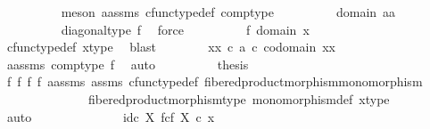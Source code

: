 \begin{isabellebody}
\ \ \ \ \ \ \ \ \isamarkupfalse%
\ {\isacharparenleft}{\kern0pt}meson\ a{\isacharunderscore}{\kern0pt}assms\ cfunc{\isacharunderscore}{\kern0pt}type{\isacharunderscore}{\kern0pt}def\ comp{\isacharunderscore}{\kern0pt}type{\isacharparenright}{\kern0pt}\isanewline
\ \ \ \ \ \ \isamarkupfalse%
\ \isamarkupfalse%
\ {\isachardoublequoteopen}domain\ {\isasymlangle}a{\isacharcomma}{\kern0pt}a{\isasymrangle}\ {\isacharequal}{\kern0pt}\ {\isasymone}{\isachardoublequoteclose}\isanewline
\ \ \ \ \ \ \ \ \isamarkupfalse%
\ diagonal{\isacharunderscore}{\kern0pt}type\ f{}\ \isamarkupfalse%
\ force\isanewline
\ \ \ \ \ \ \isamarkupfalse%
\ \isamarkupfalse%
\ f{}{}{\isacharcolon}{\kern0pt}\ {\isachardoublequoteopen}domain\ x\ {\isacharequal}{\kern0pt}\ {\isasymone}{\isachardoublequoteclose}\isanewline
\ \ \ \ \ \ \ \ \isamarkupfalse%
\ cfunc{\isacharunderscore}{\kern0pt}type{\isacharunderscore}{\kern0pt}def\ x{\isacharunderscore}{\kern0pt}type\ \isamarkupfalse%
\ blast\isanewline
\ \ \ \ \ \ \isamarkupfalse%
\ {\isachardoublequoteopen}xx\ {\isasymcirc}\isactrlsub c\ a\ {\isasymin}\isactrlsub c\ codomain\ xx{\isachardoublequoteclose}\isanewline
\ \ \ \ \ \ \ \ \isamarkupfalse%
\ a{\isacharunderscore}{\kern0pt}assms\ comp{\isacharunderscore}{\kern0pt}type\ f{}\ \isamarkupfalse%
\ auto\isanewline
\ \ \ \ \ \ \isamarkupfalse%
\ \isamarkupfalse%
\ {\isacharquery}{\kern0pt}thesis\isanewline
\ \ \ \ \ \ \ \ \isamarkupfalse%
\ f{}{}\ f{}\ f{}\ f{}\ a{\isacharunderscore}{\kern0pt}assms\ assms{\isacharparenleft}{\kern0pt}{}{\isacharparenright}{\kern0pt}\ cfunc{\isacharunderscore}{\kern0pt}type{\isacharunderscore}{\kern0pt}def\ fibered{\isacharunderscore}{\kern0pt}product{\isacharunderscore}{\kern0pt}morphism{\isacharunderscore}{\kern0pt}monomorphism\ \isanewline
\ \ \ \ \ \ \ \ \ \ \ \ \ \ fibered{\isacharunderscore}{\kern0pt}product{\isacharunderscore}{\kern0pt}morphism{\isacharunderscore}{\kern0pt}type\ monomorphism{\isacharunderscore}{\kern0pt}def\ x{\isacharunderscore}{\kern0pt}type\isanewline
\ \ \ \ \ \ \ \ \isamarkupfalse%
\ auto\isanewline
\ \ \ \ \isamarkupfalse%
\isanewline
\ \ \ \ \isamarkupfalse%
\ \isamarkupfalse%
\ {\isachardoublequoteopen}{\isachardot}{\kern0pt}{\isachardot}{\kern0pt}{\isachardot}{\kern0pt}\ {\isacharequal}{\kern0pt}\ id\isactrlsub c\ {\isacharparenleft}{\kern0pt}X\ \isactrlbsub f\isactrlesub {\isasymtimes}\isactrlsub c\isactrlbsub f\isactrlesub \ X{\isacharparenright}{\kern0pt}\ {\isasymcirc}\isactrlsub c\ x{\isachardoublequoteclose}\isanewline

\end{isabellebody}
